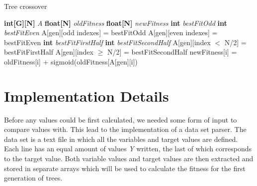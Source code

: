 \documentclass[runningheads]{llncs}
\begin{document}
\begin{algorithm}
\caption{Tree crossover}
\begin{algorithmic}[1]
\State \textbf{int[G][N]} \textit{A}
\State \textbf{float[N]} \textit{oldFitness}
\State \textbf{float[N]} \textit{newFitness}
\EndFor
{}
	\State \textbf{int} \textit{bestFitOdd}
	\State \textbf{int} \textit{bestFitEven} 
	\EndFor
	\State A[gen][odd indexes] = bestFitOdd
	\State A[gen][even indexes] = bestFitEven
\Else
	\State \textbf{int} \textit{bestFitFirstHalf}
	\State \textbf{int} \textit{bestFitSecondHalf}
	\EndFor
	\State A[gen][index $<$ N/2] = bestFitFirstHalf
	\State A[gen][index $\geq$ N/2] = bestFitSecondHalf
\EndIf
{}
	\State newFitness[i] = oldFitness[i] + sigmoid(oldFitness[A[gen][i])
\EndFor
\EndFor
\EndProcedure
\end{algorithmic}
\label{crossover_alg}
\end{algorithm}


\section{Implementation Details}
Before any values could be first calculated, we needed some form of input to compare values with. This lead to the implementation of a data set parser. The data set is a text file in which all the variables and target values are defined. Each line has an equal amount of values \textit{Y} written, the last of which corresponds to the target value. Both variable values and target values are then extracted and stored in separate arrays which will be used to calculate the fitness for the first generation of trees.
\end{document}
